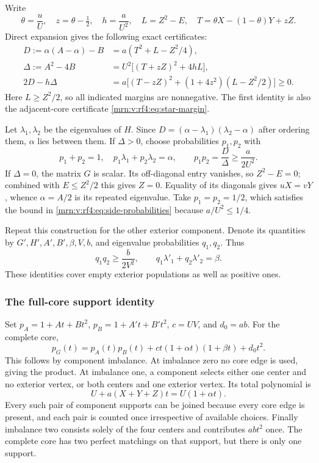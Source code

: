 \documentclass[11pt,a4paper]{article}
\theoremstyle{remark}\newtheorem{remark}[theorem]{Remark}
\begin{document}
Write
\[
\theta=\frac uU,\quad z=\theta-\tfrac12,\quad h=\frac a{U^2},\quad
L=Z^2-E,\quad T=\theta X-(1-\theta)Y+zZ.
\]
Direct expansion gives the following exact certificates:
\begin{align}
D:=\alpha(A-\alpha)-B
 &=a(T^2+L-Z^2/4),\label{mrn:v:rf4:eq:variance1}\\
\Delta:=A^2-4B
 &=U^2\bigl[(T+zZ)^2+4hL\bigr],\label{mrn:v:rf4:eq:variance2}\\
2D-h\Delta
 &=a\bigl[(T-zZ)^2+(1+4z^2)(L-Z^2/2)\bigr]\ge0.\label{mrn:v:rf4:eq:variance3}
\end{align}
Here $L\ge Z^2/2$, so all indicated margins are nonnegative. The first identity is also the adjacent-core certificate \eqref{mrn:v:rf4:eq:star-margin}.

Let $\lambda_1,\lambda_2$ be the eigenvalues of $H$. Since
$D=(\alpha-\lambda_1)(\lambda_2-\alpha)$ after ordering them, $\alpha$ lies between them. If $\Delta>0$, choose probabilities $p_1,p_2$ with
\begin{equation}\label{mrn:v:rf4:eq:side-probabilities}
p_1+p_2=1,\quad p_1\lambda_1+p_2\lambda_2=\alpha,
\qquad p_1p_2=\frac D\Delta\ge\frac a{2U^2}.
\end{equation}
If $\Delta=0$, the matrix $G$ is scalar. Its off-diagonal entry vanishes, so $Z^2-E=0$; combined with $E\le Z^2/2$ this gives $Z=0$. Equality of its diagonals gives $uX=vY$, whence $\alpha=A/2$ is its repeated eigenvalue. Take $p_1=p_2=1/2$, which satisfies the bound in \eqref{mrn:v:rf4:eq:side-probabilities} because $a/U^2\le1/4$.

Repeat this construction for the other exterior component. Denote its quantities by $G',H',A',B',\beta,V,b$, and eigenvalue probabilities $q_1,q_2$. Thus
\[
q_1q_2\ge\frac b{2V^2},\qquad
q_1\lambda'_1+q_2\lambda'_2=\beta.
\]
These identities cover empty exterior populations as well as positive ones.

\subsubsection{The full-core support identity}
Set $p_A=1+At+Bt^2$, $p_B=1+A't+B't^2$, $c=UV$, and $d_0=ab$. For the complete core,
\begin{equation}\label{mrn:v:rf4:eq:full-support}
p_G(t)=p_A(t)p_B(t)+ct(1+\alpha t)(1+\beta t)+d_0t^2.
\end{equation}
This follows by component imbalance. At imbalance zero no core edge is used, giving the product. At imbalance one, a component selects either one center and no exterior vertex, or both centers and one exterior vertex. Its total polynomial is
\[
U+a(X+Y+Z)t=U(1+\alpha t).
\]
Every such pair of component supports can be joined because every core edge is present, and each pair is counted once irrespective of available choices. Finally imbalance two consists solely of the four centers and contributes $ab t^2$ once. The complete core has two perfect matchings on that support, but there is only one support.
\end{document}
